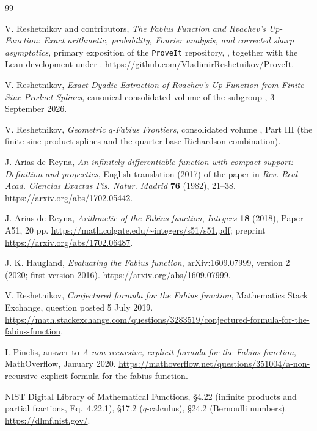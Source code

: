 \documentclass[11pt,oneside]{article}
\theoremstyle{plain}
\theoremstyle{definition}
\theoremstyle{remark}
\begin{document}
\begin{thebibliography}{99}
\setlength{\itemsep}{3pt}

V. Reshetnikov and contributors,
\emph{The Fabius Function and Rvachev's Up-Function: Exact arithmetic,
probability, Fourier analysis, and corrected sharp asymptotics},
primary exposition of the \texttt{ProveIt} repository,
, together
with the Lean development under .
\url{https://github.com/VladimirReshetnikov/ProveIt}.

V. Reshetnikov,
\emph{Exact Dyadic Extraction of Rvachev's Up-Function from Finite
Sinc-Product Splines}, canonical consolidated volume of the subgroup
,
3 September 2026.

V. Reshetnikov,
\emph{Geometric $q$-Fabius Frontiers}, consolidated volume
, Part III
(the finite sinc-product splines and the quarter-base Richardson combination).

J. Arias de Reyna,
\emph{An infinitely differentiable function with compact support: Definition
and properties}, English translation (2017) of the paper in
\emph{Rev. Real Acad. Ciencias Exactas F\'{\i}s. Natur. Madrid} \textbf{76}
(1982), 21--38.  \url{https://arxiv.org/abs/1702.05442}.

J. Arias de Reyna,
\emph{Arithmetic of the Fabius function},
\emph{Integers} \textbf{18} (2018), Paper A51, 20 pp.
\url{https://math.colgate.edu/~integers/s51/s51.pdf};
preprint \url{https://arxiv.org/abs/1702.06487}.

J. K. Haugland,
\emph{Evaluating the Fabius function},
arXiv:1609.07999, version 2 (2020; first version 2016).
\url{https://arxiv.org/abs/1609.07999}.

V. Reshetnikov,
\emph{Conjectured formula for the Fabius function},
Mathematics Stack Exchange, question posted 5 July 2019.
\url{https://math.stackexchange.com/questions/3283519/conjectured-formula-for-the-fabius-function}.

I. Pinelis,
answer to \emph{A non-recursive, explicit formula for the Fabius function},
MathOverflow, January 2020.
\url{https://mathoverflow.net/questions/351004/a-non-recursive-explicit-formula-for-the-fabius-function}.

NIST Digital Library of Mathematical Functions,
\S4.22 (infinite products and partial fractions, Eq.~4.22.1),
\S17.2 ($q$-calculus), \S24.2 (Bernoulli numbers).
\url{https://dlmf.nist.gov/}.

\end{thebibliography}
\end{document}
